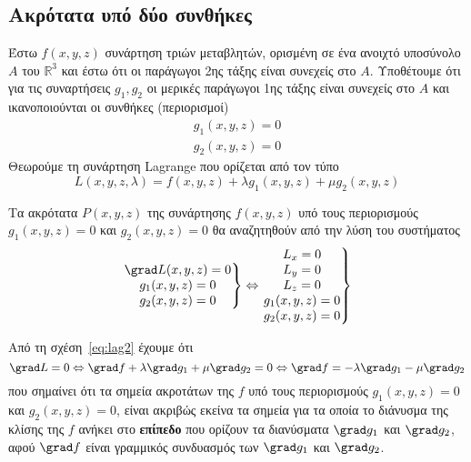 \documentclass[a4paper,table]{report}
\begin{document}
\subsection{Ακρότατα υπό δύο συνθήκες}

\begin{thm}
  Έστω $ f(x,y,z) $ συνάρτηση τριών μεταβλητών, ορισμένη σε ένα ανοιχτό 
  υποσύνολο $A$ του $ \mathbb{R}^{3} $ και έστω ότι οι παράγωγοι 2ης τάξης είναι 
  συνεχείς στο $A$. Υποθέτουμε ότι για τις συναρτήσεις $ g_{1}, g_{2} $ 
  οι μερικές παράγωγοι 1ης τάξης είναι συνεχείς στο $A$ και ικανοποιούνται οι συνθήκες 
  (περιορισμοί)
  \begin{equation} \label{eq:constr2}
    \begin{aligned}
      g_{1} (x,y,z) = 0 \\
      g_{2} (x,y,z) = 0
    \end{aligned}
  \end{equation}
  Θεωρούμε τη συνάρτηση Lagrange που ορίζεται από τον τύπο
  \[
    L(x,y,z, \lambda) = f(x,y,z) + \lambda g_{1} (x,y,z) + \mu g_{2}(x,y,z)
  \] 

  Τα ακρότατα $ P(x,y,z) $ της συνάρτησης $ f(x,y,z) $ υπό τους περιορισμούς 
  $ g_{1}(x,y,z)=0 $ και $ g_{2}(x,y,z)=0 $ θα αναζητηθούν από την λύση του συστήματος 
  \begin{equation}\label{eq:lag2}
    \left.
      \begin{matrix}
        \grad L(x,y,z)=0 \\
        g_{1} (x,y,z)=0 \\
        g_{2} (x,y,z)=0
      \end{matrix} 
    \right\} \Leftrightarrow 
    \left.
      \begin{matrix}
        L_{x}=0 \\
        L_{y}=0 \\
        L_{z}=0 \\
        g_{1}(x,y,z)=0 \\
        g_{2}(x,y,z)=0
      \end{matrix} 
    \right\}
  \end{equation}
\end{thm}

\begin{rem}
\item {}
  Από τη σχέση~\eqref{eq:lag2} έχουμε ότι 
  \[
    \grad L = 0 \Leftrightarrow \grad f + \lambda \grad g_{1} + \mu \grad g_{2} = 0 
    \Leftrightarrow \grad f = - \lambda \grad g_{1} - \mu \grad g_{2}
  \]
  που σημαίνει ότι τα σημεία ακροτάτων της $f$ υπό τους 
  περιορισμούς $g_{1}(x,y,z)=0$ και $ g_{2}(x,y,z)=0 $, είναι ακριβώς εκείνα τα σημεία 
  για τα οποία το διάνυσμα της κλίσης της $f$ ανήκει στο \textbf{επίπεδο} που ορίζουν τα
  διανύσματα $ \grad g_{1} $ και $ \grad g_{2} $, αφού $ \grad f $ είναι γραμμικός
  συνδυασμός των $ \grad g_{1} $ και $ \grad g_{2} $.
\end{rem}
\end{document}
